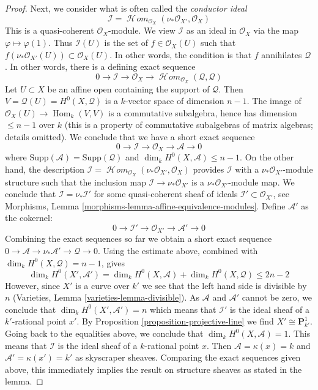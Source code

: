 \documentclass{stacks-project}
\theoremstyle{plain}
\theoremstyle{definition}
\theoremstyle{remark}
\numberwithin{equation}{subsection}
\def\Hom{\mathop{\mathrm{Hom}}\nolimits}
\def\SheafHom{\mathop{\mathcal{H}\!\mathit{om}}\nolimits}
\begin{document}
\begin{proof}
\medskip\noindent
Next, we consider what is often called the {\it conductor ideal}
$$
\mathcal{I} = \SheafHom_{\mathcal{O}_X}(\nu_*\mathcal{O}_{X'}, \mathcal{O}_X)
$$
This is a quasi-coherent $\mathcal{O}_X$-module. We view $\mathcal{I}$
as an ideal in $\mathcal{O}_X$ via the map $\varphi \mapsto \varphi(1)$.
Thus $\mathcal{I}(U)$ is the set of $f \in \mathcal{O}_X(U)$ such that
$f \left(\nu_*\mathcal{O}_{X'}(U)\right) \subset \mathcal{O}_X(U)$. In
other words, the condition is that $f$ annihilates $\mathcal{Q}$.
In other words, there is a defining exact sequence
$$
0 \to \mathcal{I} \to \mathcal{O}_X \to
\SheafHom_{\mathcal{O}_X}(\mathcal{Q}, \mathcal{Q})
$$
Let $U \subset X$ be an affine open containing the support of $\mathcal{Q}$.
Then $V = \mathcal{Q}(U) = H^0(X, \mathcal{Q})$ is a $k$-vector space
of dimension $n - 1$. The image of
$\mathcal{O}_X(U) \to \Hom_k(V, V)$ is a commutative subalgebra,
hence has dimension $\leq n - 1$ over $k$ (this is a property of
commutative subalgebras of matrix algebras; details omitted).
We conclude that we have a short exact sequence
$$
0 \to \mathcal{I} \to \mathcal{O}_X \to \mathcal{A} \to 0
$$
where $\text{Supp}(\mathcal{A}) = \text{Supp}(\mathcal{Q})$
and $\dim_k H^0(X, \mathcal{A}) \leq n - 1$.
On the other hand, the description
$\mathcal{I} = \SheafHom_{\mathcal{O}_X}(\nu_*\mathcal{O}_{X'}, \mathcal{O}_X)$
provides $\mathcal{I}$ with a $\nu_*\mathcal{O}_{X'}$-module structure
such that the inclusion map $\mathcal{I} \to \nu_*\mathcal{O}_{X'}$
is a $\nu_*\mathcal{O}_{X'}$-module map.
We conclude that $\mathcal{I} = \nu_*\mathcal{I}'$
for some quasi-coherent sheaf of ideals
$\mathcal{I}' \subset \mathcal{O}_{X'}$, see
Morphisms, Lemma \ref{morphisms-lemma-affine-equivalence-modules}.
Define $\mathcal{A}'$ as the cokernel:
$$
0 \to \mathcal{I}' \to \mathcal{O}_{X'} \to \mathcal{A}' \to 0
$$
Combining the exact sequences so far we obtain a short exact sequence
$0 \to \mathcal{A} \to \nu_*\mathcal{A}' \to \mathcal{Q} \to 0$.
Using the estimate above,
combined with $\dim_k H^0(X, \mathcal{Q}) = n - 1$, gives
$$
\dim_k H^0(X', \mathcal{A}') =
\dim_k H^0(X, \mathcal{A}) + \dim_k H^0(X, \mathcal{Q}) \leq 2 n - 2
$$
However, since $X'$ is a curve over $k'$ we see that
the left hand side is divisible by $n$
(Varieties, Lemma \ref{varieties-lemma-divisible}).
As $\mathcal{A}$ and $\mathcal{A}'$ cannot be zero, we conclude that
$\dim_k H^0(X', \mathcal{A}') = n$ which means that $\mathcal{I}'$
is the ideal sheaf of a $k'$-rational point $x'$.
By Proposition \ref{proposition-projective-line}
we find $X' \cong \mathbf{P}^1_{k'}$.
Going back to the equalities above, we conclude that
$\dim_k H^0(X, \mathcal{A}) = 1$. This
means that $\mathcal{I}$ is the ideal sheaf of a
$k$-rational point $x$. Then $\mathcal{A} = \kappa(x) = k$
and $\mathcal{A}' = \kappa(x') = k'$ as skyscraper sheaves.
Comparing the exact sequences given above,
this immediately implies the result on structure sheaves
as stated in the lemma.
\end{proof}
\end{document}
